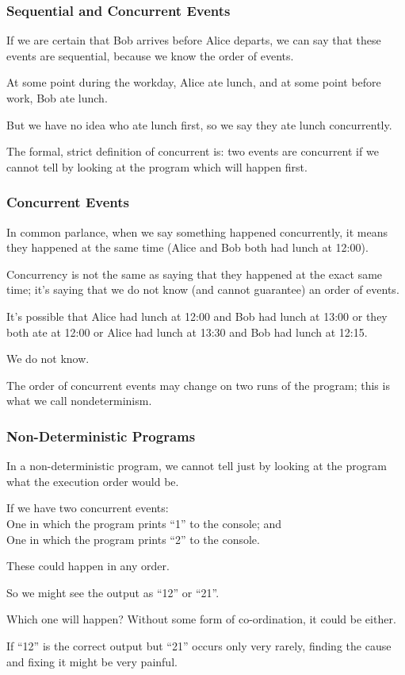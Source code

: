 \begin{frame}
\frametitle{Sequential and Concurrent Events}

If we are certain that Bob arrives before Alice departs, we can say that these events are \alert{sequential}, because we know the order of events. 

At some point during the workday, Alice ate lunch, and at some point before work, Bob ate lunch. 

But we have no idea who ate lunch first, so we say they ate lunch \alert{concurrently}. 

The formal, strict definition of concurrent is: two events are concurrent if we cannot tell by looking at the program which will happen first. 

\end{frame}

\begin{frame}
\frametitle{Concurrent Events}

In common parlance, when we say something happened concurrently, it means they happened at the same time (Alice and Bob both had lunch at 12:00). 

Concurrency is not the same as saying that they happened at the exact same time; it's saying that we do not know (and cannot guarantee) an order of events. 

It's possible that Alice had lunch at 12:00 and Bob had lunch at 13:00 or they both ate at 12:00 or Alice had lunch at 13:30 and Bob had lunch at 12:15. 

We do not know. 

The order of concurrent events may change on two runs of the program; this is what we call \alert{nondeterminism}.

\end{frame}

\begin{frame}
\frametitle{Non-Deterministic Programs}

In a non-deterministic program, we cannot tell just by looking at the program what the execution order would be. 

If we have two concurrent events: \\
\quad One in which the program prints ``1'' to the console; and\\
\quad One in which the program prints ``2'' to the console.

These could happen in any order. 

So we might see the output as ``12'' or ``21''. 

Which one will happen? Without some form of co-ordination, it could be either. 

If ``12'' is the correct output but ``21'' occurs only very rarely, finding the cause and fixing it might be very painful.


\end{frame}


